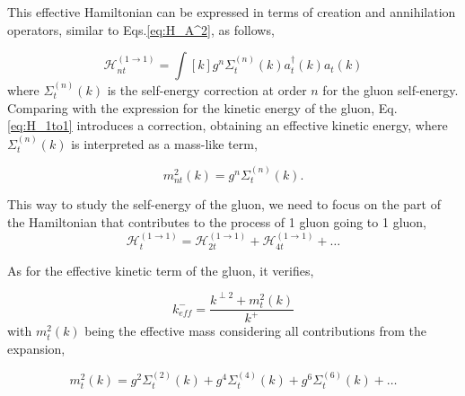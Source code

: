 \documentclass[11pt,a4paper,twoside,pdf]{article}
\numberwithin{equation}{section}
\begin{document}
This effective Hamiltonian can be expressed in terms of creation and annihilation operators,
similar to Eqs.\eqref{eq:H_A^2}, as follows,

\begin{equation}
    \mathcal{H}_{n t}^{(1 \rightarrow 1)} = \int [k] g^n \Sigma_t^{(n)} (k) 
    a^{\dagger}_t (k) a_t (k) 
    \label{eq:H_1to1}
\end{equation}
where $\Sigma_t^{(n)} (k)$ is the self-energy correction at order $n$ for the gluon
self-energy. Comparing with the expression for the kinetic energy of the gluon, Eq.
\eqref{eq:H_1to1} introduces a correction, obtaining an effective kinetic energy, where
$\Sigma_t^{(n)} (k)$ is interpreted as a mass-like term,

\begin{equation}
    m_{n t}^2 (k) = g^n \Sigma_t^{(n)} (k).
\end{equation}

This way to study the self-energy of the gluon, we need to focus on the part of the
Hamiltonian that contributes to the process of 1 gluon going to 1 gluon,
\begin{equation}
    \mathcal{H}_{t}^{(1 \rightarrow 1)} = \mathcal{H}_{2 t}^{(1 \rightarrow 1)} + 
    \mathcal{H}_{4 t}^{(1 \rightarrow 1)} + \ldots
\end{equation}

As for the effective kinetic term of the gluon, it verifies,

\begin{equation}
    k_{eff}^- = \frac{k^{\perp 2} + m_{t}^2 (k)}{k^+}
\end{equation}
with $m_{t}^2 (k)$ being the effective mass considering all contributions from the 
expansion,

\begin{equation}
    m_{t}^2 (k) = g^2 \Sigma_t^{(2)} (k) + g^4 \Sigma_t^{(4)} (k) + g^6 \Sigma_t^{(6)} (k) + \ldots
\end{equation} 

\end{document}
